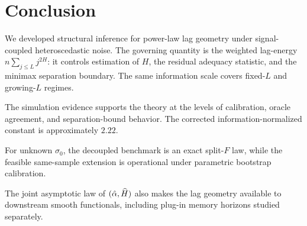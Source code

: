 \section{Conclusion}
\label{sec:conclusion}

We developed structural inference for power-law lag geometry under
signal-coupled heteroscedastic noise. The governing quantity is the weighted
lag-energy $n\sum_{j \leq L} j^{2H}$: it controls estimation of $H$, the
residual adequacy statistic, and the minimax separation boundary. The same
information scale covers fixed-$L$ and growing-$L$ regimes.

The simulation evidence supports the theory at the levels of calibration,
oracle agreement, and separation-bound behavior. The corrected
information-normalized constant is approximately $2.22$.

For unknown $\sigma_0$, the decoupled benchmark is an exact split-$F$ law,
while the feasible same-sample extension is operational under parametric
bootstrap calibration.

The joint asymptotic law of $(\hat\alpha,\widehat{H})$ also makes the lag geometry
available to downstream smooth functionals, including plug-in memory horizons
studied separately.
